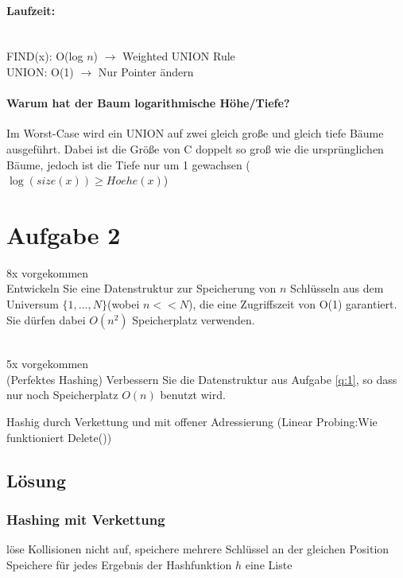 \documentclass[10pt,a4paper]{article}
\begin{document}
\paragraph*{Laufzeit:}~\\
FIND(x): O(log $n$) $\rightarrow$ Weighted UNION Rule \\ 
UNION: O(1) $\rightarrow$ Nur Pointer ändern

\paragraph{Warum hat der Baum logarithmische Höhe/Tiefe?}
Im Worst-Case wird ein UNION auf zwei gleich große und gleich tiefe Bäume ausgeführt. Dabei ist die Größe von C doppelt so groß wie die ursprünglichen Bäume, jedoch ist die Tiefe nur um 1 gewachsen ($\log(size(x))\geq Hoehe(x)$)






\section*{Aufgabe 2}\label{q:1} 
8x vorgekommen \\
Entwickeln Sie eine Datenstruktur zur Speicherung von $n$ Schlüsseln aus dem Universum $\{1,...,N\}$(wobei $n<<N$), die eine Zugriffszeit von O(1) garantiert. Sie dürfen dabei $O(n^2)$ Speicherplatz verwenden.

~\\
5x vorgekommen \\
(Perfektes Hashing) Verbessern Sie die Datenstruktur aus Aufgabe \ref{q:1}, so dass nur noch Speicherplatz $O(n)$ benutzt wird.

Hashig durch Verkettung und mit offener Adressierung (Linear Probing:Wie funktioniert Delete())

\subsection*{Lösung}
\subsubsection*{Hashing mit Verkettung} löse Kollisionen nicht auf, speichere mehrere Schlüssel an der gleichen Position
\\

Speichere für jedes Ergebnis der Hashfunktion $h$ eine Liste
\end{document}
